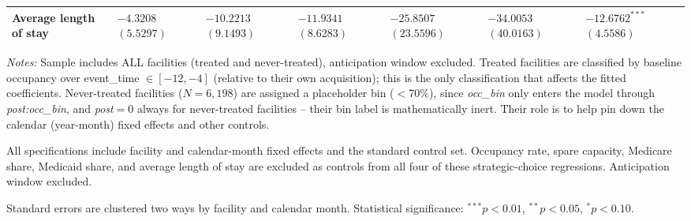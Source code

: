 \documentclass[12pt]{article}
\begin{document}
\begin{table}[H]
\begin{threeparttable}
\begin{tabularx}{\textwidth}{@{} l Y Y Y Y Y Y @{}}
Average length of stay &  &  &  &  &  &  \\
\bottomrule
\end{tabularx}

\begin{tablenotes}[flushleft]
\footnotesize
\item \textit{Notes:} Sample includes ALL facilities (treated and never-treated), anticipation window excluded. Treated facilities are classified by baseline occupancy over event\_time $\in [-12,-4]$ (relative to their own acquisition); this is the only classification that affects the fitted coefficients. Never-treated facilities ($N=6,198$) are assigned a placeholder bin ($<$70\%), since \textit{occ\_bin} only enters the model through \textit{post:occ\_bin}, and \textit{post}$=0$ always for never-treated facilities -- their bin label is mathematically inert. Their role is to help pin down the calendar (year-month) fixed effects and other controls.
\item All specifications include facility and calendar-month fixed effects and the standard control set. Occupancy rate, spare capacity, Medicare share, Medicaid share, and average length of stay are excluded as controls from all four of these strategic-choice regressions. Anticipation window excluded.
\item Standard errors are clustered two ways by facility and calendar month. Statistical significance: $^{***}p<0.01$, $^{**}p<0.05$, $^{*}p<0.10$.
\end{tablenotes}
\end{threeparttable}
\end{table}
\end{document}
